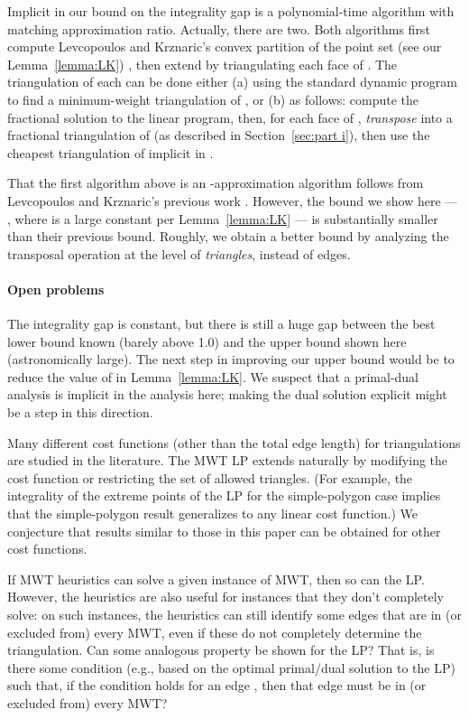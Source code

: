 \documentclass[final]{siamltex}
\begin{document}
Implicit in our bound on the integrality gap
is a polynomial-time algorithm with matching approximation ratio.
Actually, there are two.
Both algorithms first compute Levcopoulos and Krznaric's convex partition 
of the point set
(see our Lemma~\ref{lemma:LK}) \cite{krznaric1998quasi},
then extend  by triangulating each face  of .
The triangulation of each  can be done either 
(a) using the standard dynamic program to find a minimum-weight triangulation of ,
or (b) as follows: compute the fractional solution  to the linear program,
then, for each face  of ,
{\em transpose}  into a fractional triangulation 
of 
(as described in Section~\ref{sec:part i}),
then use the cheapest triangulation of  implicit in .

That the first algorithm above is an -approximation algorithm
follows from Levcopoulos and Krznaric's previous work \cite{krznaric1998quasi}.
However, the bound we show here
--- , where  is a large constant per Lemma~\ref{lemma:LK} ---
is substantially smaller 
than their previous bound.
Roughly, we obtain a better bound by analyzing the transposal operation 
at the level of {\em triangles}, instead of edges.

\paragraph{Open problems}
The integrality gap is constant,
but there is still a huge gap between the best lower bound known (barely above 1.0) and the upper bound shown here (astronomically large).
The next step in improving our upper bound
would be to reduce the value of  in Lemma~\ref{lemma:LK}.
We suspect that a primal-dual analysis is implicit in the analysis here; 
making the dual solution explicit might be a step in this direction.

Many different cost functions 
(other than the total edge length) for triangulations
are studied in the literature.
The MWT LP extends naturally
by modifying the cost function or restricting the set of allowed triangles.
(For example, the integrality of the extreme points of the LP for the simple-polygon case
implies that the simple-polygon result generalizes to any linear cost function.)
We conjecture that results similar to those in this paper can be obtained for other cost functions.

If MWT heuristics can solve a given instance of MWT, then so can the LP.
However, the heuristics are also useful for instances that they don't completely solve:
on such instances, the heuristics can still identify some edges that are in (or excluded from) 
every MWT, even if these do not completely determine the triangulation.
Can some analogous property be shown for the LP?
That is, is there some condition (e.g., based on the optimal primal/dual solution to the LP) such that,
if the condition holds for an edge , then that edge must be in (or excluded from) every MWT?
\end{document}
